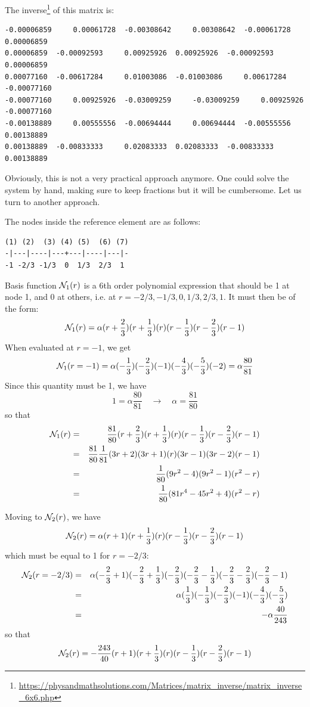 The inverse\footnote{\url{https://physandmathsolutions.com/Matrices/matrix_inverse/matrix_inverse_6x6.php}} of this matrix is:

\begin{verbatim}
-0.00006859 	0.00061728 	-0.00308642 	0.00308642 	-0.00061728 	0.00006859
0.00006859 	-0.00092593 	0.00925926 	0.00925926 	-0.00092593 	0.00006859
0.00077160 	-0.00617284 	0.01003086 	-0.01003086 	0.00617284 	-0.00077160
-0.00077160 	0.00925926 	-0.03009259 	-0.03009259 	0.00925926 	-0.00077160
-0.00138889 	0.00555556 	-0.00694444 	0.00694444 	-0.00555556 	0.00138889
0.00138889 	-0.00833333 	0.02083333 	0.02083333 	-0.00833333 	0.00138889
\end{verbatim}

Obviously, this is not a very practical approach anymore. One could 
solve the system by hand, making sure to keep fractions but it will be 
cumbersome. Let us turn to another approach.

The nodes inside the reference element are as follows:

\begin{verbatim}
(1) (2)  (3) (4) (5)  (6) (7)
-|---|----|---+---|----|---|-
-1 -2/3 -1/3  0  1/3  2/3  1
\end{verbatim}

Basis function ${\mathcal{N}}_1(r)$ is a 6th order polynomial expression 
that should be 1 at node 1, and 0 at others,
i.e. at $r=-2/3,-1/3,0,1/3,2/3,1$. It must then be of the form:
\[
{\mathcal{N}}_1(r) = \alpha(r+\frac23)(r+\frac13)(r)(r-\frac13)(r-\frac23)(r-1)
\]
When evaluated at $r=-1$, we get
\[
{\mathcal{N}}_1(r=-1) 
= \alpha(-\frac13)(-\frac23)(-1)(-\frac43)(-\frac53)(-2)
= \alpha\frac{80}{81}
\]
Since this quantity must be 1, we have
\[
1 = \alpha \frac{80}{81}
\quad
\rightarrow
\quad
\alpha=\frac{81}{80}
\]
so that 
\begin{eqnarray}
{\mathcal{N}}_1(r)
&=& \frac{81}{80}(r+\frac23)(r+\frac13)(r)(r-\frac13)(r-\frac23)(r-1) \nonumber\\
&=& \frac{81}{80} \frac{1}{81} (3r+2)(3r+1)(r)(3r-1)(3r-2)(r-1) \nonumber\\
&=& \frac{1}{80} (9r^2-4)(9r^2-1)(r^2-r) \nonumber\\
&=& \frac{1}{80} (81r^4 -45r^2 +4)(r^2-r) 
\end{eqnarray}

Moving to ${\mathcal{N}}_2(r)$, we have
\[
{\mathcal{N}}_2(r)= \alpha(r+1)(r+\frac13)(r)(r-\frac13)(r-\frac23)(r-1)
\]
which must be equal to 1 for $r=-2/3$:
\begin{eqnarray}
{\mathcal{N}}_2(r=-2/3)
&=& \alpha(-\frac23+1)(-\frac23+\frac13)(-\frac23)(-\frac23-\frac13)(-\frac23-\frac23)(-\frac23-1)\nonumber\\
&=& \alpha (\frac13)(-\frac13)(-\frac23)(-1)(-\frac43)(-\frac53)\nonumber\\
&=& -\alpha \frac{40}{243}
\end{eqnarray}
so that 
\[
{\mathcal{N}}_2(r)= -\frac{243}{40}(r+1)(r+\frac13)(r)(r-\frac13)(r-\frac23)(r-1)
\]

